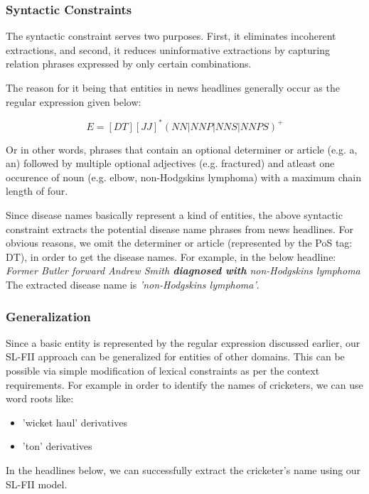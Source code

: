 \documentclass{article}
\begin{document}
\subsubsection{Syntactic Constraints}

The syntactic constraint serves two purposes. First, it eliminates incoherent extractions, and second, it
reduces uninformative extractions by capturing relation phrases
expressed by only certain combinations. 

The reason for it being that entities in news headlines generally occur as the regular expression given below:

\[E = [DT][JJ]^*(NN|NNP|NNS|NNPS)^+\]

Or in other words, phrases that contain an optional determiner or article (e.g. a, an)  followed by multiple optional adjectives (e.g. fractured) and atleast one occurence of noun (e.g. elbow, non-Hodgskins lymphoma) with a maximum chain length of four. 
 
Since disease names basically represent a kind of entities, the above syntactic constraint extracts the potential disease name phrases from news headlines. For obvious reasons, we omit the determiner or article (represented by the PoS tag: DT), in order to get the disease names. For example, in the below headline: \\

\textit{Former Butler forward Andrew Smith \textbf{diagnosed with} non-Hodgskins lymphoma 
}\\

The extracted disease name is \textit{'non-Hodgskins lymphoma'}.


\subsubsection{Generalization}
Since a basic entity is represented by the regular expression discussed earlier, our SL-FII approach can be generalized for entities of other domains. This can be possible via simple modification of lexical constraints as per the context requirements. For example in order to identify the names of cricketers, we can use word roots like:

\begin{itemize}
\item 'wicket haul' derivatives
\item 'ton' derivatives
\end{itemize}

In the headlines below, we can successfully extract the cricketer's name using our SL-FII model.\\
\end{document}
